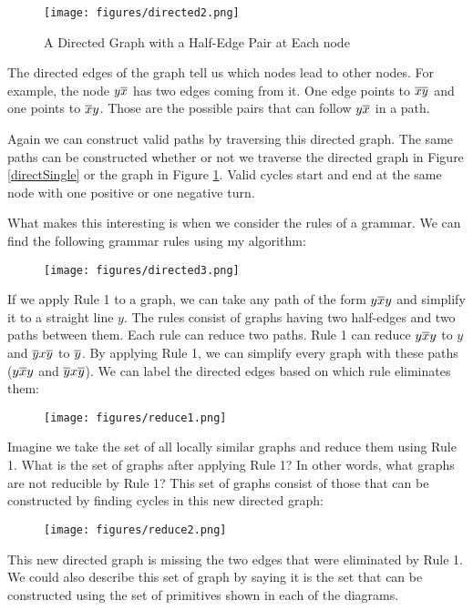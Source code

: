 \documentclass[acmtog]{acmart}
\begin{document}
\begin{figure}[H]
\centering
\texttt{[image: figures/directed2.png]}
\caption{A Directed Graph with a Half-Edge Pair at Each node}
\label{directPair}
\end{figure}

The directed edges of the graph tell us which nodes lead to other nodes. For example, the node
$y\overline{x}$ has two edges coming from it. One edge points to $\overline{xy}$ and one
points to $\overline{x}y$. Those are the possible pairs that can follow $y\overline{x}$ in a
path.

Again we can construct valid paths by traversing this
directed graph. The same paths can be constructed whether or not we
traverse the directed graph in Figure \ref{directSingle} or the graph in Figure
\ref{directPair}. Valid cycles start and end at the same node with one positive
or one negative turn.

What makes this interesting is when we consider the rules of a grammar. We can
find the following grammar rules using my algorithm:

\begin{figure}[H]
\centering
\texttt{[image: figures/directed3.png]}
\end{figure}

If we apply Rule 1 to a graph, we can take any path of the form $y\overline{x}y$ and
simplify it to a straight line $y$. The rules consist of graphs having two half-edges and
two paths between them. Each rule can reduce two paths. Rule 1 can reduce
$y\overline{x}y$ to $y$ and $\overline{y}x\overline{y}$ to $\overline{y}$. By applying Rule 1, we can
simplify every graph with these paths ($y\overline{x}y$ and $\overline{y}x\overline{y}$). We can
label the directed edges based on which rule eliminates them:

\begin{figure}[H]
\centering
\texttt{[image: figures/reduce1.png]}
\end{figure}

Imagine we take the set of all locally similar graphs and reduce them using Rule
1. What is the set of graphs after applying Rule 1? In other words, what graphs
are not reducible by Rule 1? This set of graphs consist of those that can be
constructed by finding cycles in this new directed graph:

\begin{figure}[H]
\centering
\texttt{[image: figures/reduce2.png]}
\end{figure}

This new directed graph is missing the two edges that were eliminated by Rule 1.
We could also describe this set of graph by saying it is the set that can be
constructed using the set of primitives shown in each of the diagrams.
\end{document}

